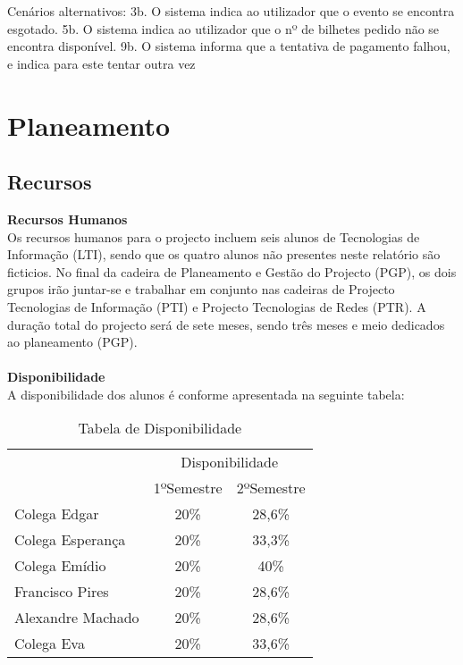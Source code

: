 \documentclass[12pt, a4paper, twoside]{report} %
\begin{document}
Cenários alternativos: 
	3b. O sistema indica ao utilizador que o evento se encontra esgotado.
	5b. O sistema indica ao utilizador que o nº de bilhetes pedido não se encontra disponível.
	9b. O sistema informa que a tentativa de pagamento falhou, e indica para este tentar outra vez





\chapter{Planeamento}

\section{Recursos}

\textbf{Recursos Humanos}
\\

Os recursos humanos para o projecto incluem seis alunos de Tecnologias de Informação (LTI), sendo que os quatro alunos não presentes neste relatório são ficticios. 
No final da cadeira de Planeamento e Gestão do Projecto (PGP), os dois grupos irão juntar-se e trabalhar em conjunto nas cadeiras de Projecto Tecnologias de Informação (PTI) e Projecto Tecnologias de Redes (PTR). A duração total do projecto será de sete meses, sendo três meses e meio dedicados ao planeamento (PGP).
\\
\\
\textbf{Disponibilidade}
\\

A disponibilidade dos alunos é conforme apresentada na seguinte tabela:

\begin{table}[h]
\centering
\begin{tabular}{|l|c c|}
\hline
\multirow{2}{*}{} & \multicolumn{2}{c|}{Disponibilidade} \\ \cline{2-3} 
                  		& 1ºSemestre        & 2ºSemestre       \\ \hline
Colega Edgar \footnotemark      & 20\%              & 28,6\%             \\ \hline
Colega Esperança \footnotemark  & 20\%              & 33,3\%           \\ \hline
Colega Emídio \footnotemark     & 20\%              & 40\%           \\ \hline
Francisco Pires                 & 20\%              & 28,6\%           \\ \hline
Alexandre Machado               & 20\%              & 28,6\%           \\ \hline
Colega Eva\footnotemark         & 20\%              & 33,6\%                \\ \hline
\end{tabular}
\caption{Tabela de Disponibilidade}
\label{disponibilidade}
\end{table}
\end{document}
